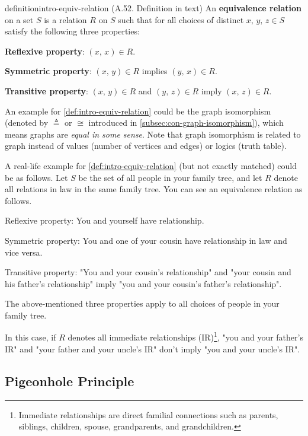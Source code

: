 \documentclass[../src/handouts/main.tex]{subfiles}
\begin{document}
\begin{recallable}{definition}{}{intro-equiv-relation}
  (A.52. Definition in text)
  An \textbf{equivalence relation} on a set $S$ is a relation $R$ on $S$ such that for all choices of distinct $x,\, y,\,z \in S$ satisfy the following three properties:
  \begin{enumerate*}
    \item \textbf{Reflexive property}: $(x,\, x) \in R$.
    \item \textbf{Symmetric property}: $(x,\, y) \in R$ implies $(y,\, x) \in R$.
    \item \textbf{Transitive property}: $(x,\, y) \in R$ and $(y,\, z) \in R$ imply $(x,\, z) \in R$.
  \end{enumerate*}
\end{recallable}

An example for \cref{def:intro-equiv-relation} could be the graph isomorphism (denoted by $\triangleq$ or $\cong$ introduced in \cref{subsec:con-graph-isomorphism}), which means graphs are \textit{equal in some sense}. Note that graph isomorphism is related to graph instead of values (number of vertices and edges) or logics (truth table).

A real-life example for \cref{def:intro-equiv-relation} (but not exactly matched) could be as follows. Let $S$ be the set of all people in your family tree, and let $R$ denote all relations in law in the same family tree. You can see an equivalence relation as follows.
\begin{enumerate*}
  \item Reflexive property: You and yourself have relationship.
  \item Symmetric property: You and one of your cousin have relationship in law and vice versa.
  \item Transitive property: "You and your cousin's relationship" and "your cousin and his father's relationship" imply "you and your cousin's father's relationship".
  \item The above-mentioned three properties apply to all choices of people in your family tree.
\end{enumerate*}
In this case, if $R$ denotes all immediate relationships (IR)\footnote{Immediate relationships are direct familial connections such as parents, siblings, children, spouse, grandparents, and grandchildren.}, "you and your father's IR" and "your father and your uncle's IR" don't imply "you and your uncle's IR".

\subsection{Pigeonhole Principle}
\end{document}
